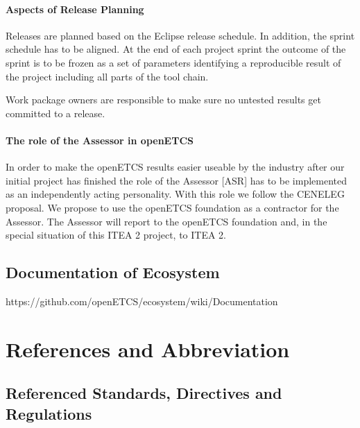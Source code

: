\documentclass{template/openetcs_article}
\begin{document}
\paragraph{Aspects of Release Planning}
Releases are planned based on the Eclipse release schedule. In addition, the sprint schedule has to be aligned. At the end of each project sprint the outcome of the sprint is to be frozen as a set of parameters identifying a reproducible result of the project including all parts of the tool chain. 

Work package owners are responsible to make sure no untested results get committed to a release.


\paragraph{The role of the Assessor in openETCS}
In order to make the openETCS results easier useable by the industry after our initial project has finished the role of the Assessor [ASR] has to be implemented as an independently acting personality. With this role we follow the CENELEG proposal. We propose to use the openETCS foundation as a contractor for the Assessor. The Assessor will report to the openETCS foundation and, in the special situation of this ITEA 2 project, to ITEA 2.



\subsection{Documentation of Ecosystem}
https://github.com/openETCS/ecosystem/wiki/Documentation



\section{References and Abbreviation}
\subsection{Referenced Standards, Directives and Regulations}
\end{document}
